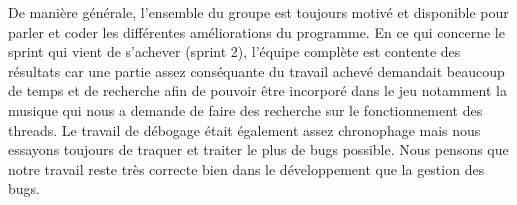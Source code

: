 De manière générale, l'ensemble du groupe est toujours motivé et disponible pour parler et coder les différentes améliorations du programme.
En ce qui concerne le sprint qui vient de s'achever (sprint 2), l'équipe complète est contente des résultats car une partie assez conséquante du travail achevé demandait beaucoup de temps et de recherche afin de pouvoir être incorporé dans le jeu notamment la musique qui nous a demande de faire des recherche sur le fonctionnement des threads.
Le travail de débogage était également assez chronophage mais nous essayons toujours de traquer et traiter le plus de bugs possible.
Nous pensons que notre travail reste très correcte bien dans le développement que la gestion des bugs.

